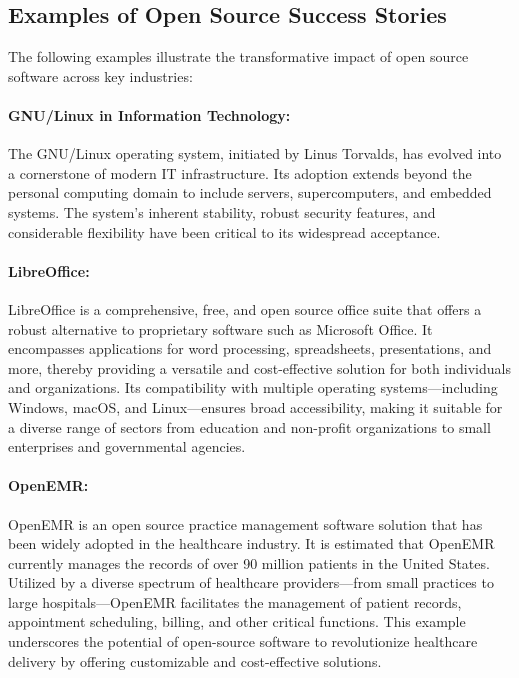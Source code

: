 \subsection{Examples of Open Source Success Stories}

The following examples illustrate the transformative impact of open source software across key industries:

\paragraph{GNU/Linux in Information Technology:}  
The GNU/Linux operating system, initiated by Linus Torvalds, has evolved into a cornerstone of modern IT infrastructure. Its adoption extends beyond the personal computing domain to include servers, supercomputers, and embedded systems. The system’s inherent stability, robust security features, and considerable flexibility have been critical to its widespread acceptance.
\cite{Linux-Open-source}

\paragraph{LibreOffice:}  
LibreOffice is a comprehensive, free, and open source office suite that offers a robust alternative to proprietary software such as Microsoft Office. It encompasses applications for word processing, spreadsheets, presentations, and more, thereby providing a versatile and cost-effective solution for both individuals and organizations. Its compatibility with multiple operating systems—including Windows, macOS, and Linux—ensures broad accessibility, making it suitable for a diverse range of sectors from education and non-profit organizations to small enterprises and governmental agencies.
\cite{LibreOffice-Website}

\paragraph{OpenEMR:}  
OpenEMR is an open source practice management software solution that has been widely adopted in the healthcare industry. It is estimated that OpenEMR currently manages the records of over 90 million patients in the United States. Utilized by a diverse spectrum of healthcare providers—from small practices to large hospitals—OpenEMR facilitates the management of patient records, appointment scheduling, billing, and other critical functions. This example underscores the potential of open-source software to revolutionize healthcare delivery by offering customizable and cost-effective solutions.

